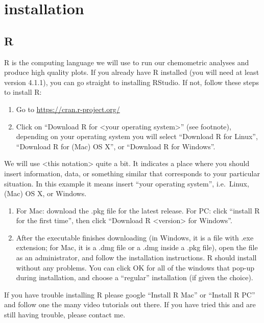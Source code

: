 \documentclass[
]{krantz}
\begin{document}
\hypertarget{installation}{%
\section{installation}\label{installation}}

\hypertarget{r}{%
\subsection{R}\label{r}}

R is the computing language we will use to run our chemometric analyses and produce high quality plots. If you already have R installed (you will need at least version 4.1.1), you can go straight to installing RStudio. If not, follow these steps to install R:

\begin{enumerate}
\def\labelenumi{\arabic{enumi}.}
\item
  Go to \url{https://cran.r-project.org/}
\item
  Click on ``Download R for \textless your operating system\textgreater{}'' (see footnote), depending on your operating system you will select ``Download R for Linux'', ``Download R for (Mac) OS X'', or ``Download R for Windows''.
\end{enumerate}

We will use \textless this notation\textgreater{} quite a bit. It indicates a place where you should insert information, data, or something similar that corresponds to your particular situation. In this example it means insert ``your operating system'', i.e.~Linux, (Mac) OS X, or Windows.

\begin{enumerate}
\def\labelenumi{\arabic{enumi}.}
\setcounter{enumi}{2}
\item
  For Mac: download the .pkg file for the latest release. For PC: click ``install R for the first time'', then click ``Download R \textless version\textgreater{} for Windows''.
\item
  After the executable finishes downloading (in Windows, it is a file with .exe extension; for Mac, it is a .dmg file or a .dmg inside a .pkg file), open the file as an administrator, and follow the installation instructions. R should install without any problems. You can click OK for all of the windows that pop-up during installation, and choose a ``regular'' installation (if given the choice).
\end{enumerate}

If you have trouble installing R please google ``Install R Mac'' or ``Install R PC'' and follow one the many video tutorials out there. If you have tried this and are still having trouble, please contact me.
\end{document}
